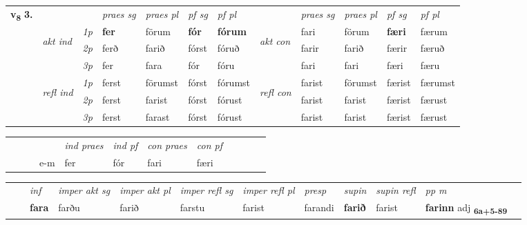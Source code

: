 \begin{tabular}{llllllllllll} \toprule
\multirow{4}{*}{{{\textbf{v{\textsubscript{8}}} \Large{\textbf{3.}}}}}  & &   &  \textit{praes sg}  & \textit{praes pl}  &\textit{ pf sg} & \textit{pf pl} &  &  \textit{praes sg}  & \textit{praes pl}  & \textit{pf sg} & \textit{pf pl } \\*
	\cmidrule{4-7} \cmidrule{9-12}
 & \multirow{3}{*}{\begin{turn}{90}\textit{akt ind}\end{turn}} & {\textit{1p}} & \textbf{fer} & förum    & \textbf{fór} & \textbf{fórum} & \multirow{3}{*}{\begin{turn}{90}\textit{akt con}\end{turn}} &fari & förum & \textbf{færi} & færum\\*
& &  {\textit{2p}} &  ferð  & farið   & fórst & fóruð & & farir & farið & færir & færuð \\*
& &  {\textit{3p}} & fer & fara   & fór & fóru & & fari & fari& færi & færu  \\*
\cmidrule{4-7} \cmidrule{9-12}
 &\multirow{3}{*}{\begin{turn}{90}\textit{refl ind}\end{turn}} & {\textit{1p}} & ferst & förumst    & fórst & fórumst & \multirow{3}{*}{\begin{turn}{90}\textit{refl con}\end{turn}}  &farist & förumst & færist & færumst\\*
 &&  {\textit{2p}} &  ferst  & farist   & fórst & fórust & &farist & farist & færist & færust \\*
& &  {\textit{3p}} & ferst & farast   & fórst & fórust & & farist & farist& færist & færust  \\*
\cmidrule{4-7} \cmidrule{9-12}
\end{tabular}


\begin{tabular}{llllllllllll}
 & &  & &  \textit{ind praes} & \textit{ind pf} & \textit{con praes} & \textit{con pf} \\*
&  & & e-m & fer & fór & fari & færi \\*
\cmidrule{5-9}
\end{tabular}


\begin{tabular}{llllllllllll}
 & & \textit{inf} & \textit{imper akt sg} & \textit{imper akt pl} & \textit{imper refl sg} & \textit{imper refl pl} & \textit{presp} & \textit{supin} & \textit{supin refl} & \textit{pp m}     \\*
  & & \textbf{fara} & farðu  & farið & farstu & farist & farandi &  \textbf{farið} & farist & \textbf{farinn} adj \textbf{\textsubscript{6a+5-89}} \\*
\cmidrule{1-12}
\end{tabular}



